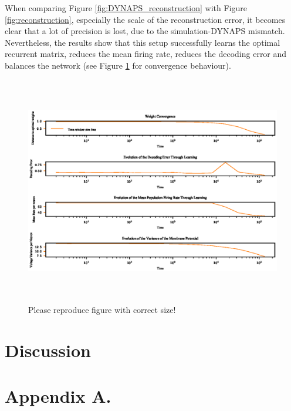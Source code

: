 \documentclass[twoside,11pt]{article}
\begin{document}
When comparing Figure \ref{fig:DYNAPS_reconstruction} with Figure \ref{fig:reconstruction},
especially the scale of the reconstruction error, it
becomes clear that a lot of precision is lost, due to the simulation-DYNAPS mismatch.
Nevertheless, the results show that this setup successfully learns the optimal recurrent matrix,
reduces the mean firing rate, reduces the decoding error and balances the network
(see Figure \ref{fig:DYNAPS_convergence} for convergence behaviour).

\begin{figure}[!htb]
  \centering
  \includegraphics[width = \columnwidth, height=10cm]{figures/DYNAPS_convergence.eps}
  \caption{Please reproduce figure with correct size!}
  \label{fig:DYNAPS_convergence}
\end{figure}

\newpage

\section{Discussion}




\newpage

\appendix
\section*{Appendix A.}


\vskip 0.2in

\end{document}
